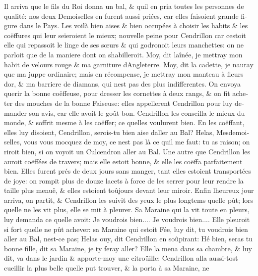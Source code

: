 \documentclass[14pt,a4paper]{memoir}
\begin{document}
\begin{otherlanguage}{french}
Il arriva que le fils du Roi donna un bal, \& qu\textquotesingle il en
pria toutes les personnes de qualité: nos deux Demoiselles en furent
aussi priées, car elles faisoient grande figure dans le Pays. Les voilà
bien aises \& bien occupées à choisir les habits \& les coëffures qui
leur seïeroient le mieux; nouvelle peine pour Cendrillon car
c\textquotesingle estoit elle qui repassoit le linge de ses sœurs \& qui
godronoit leurs manchettes: on ne parloit que de la maniere dont on
s\textquotesingle habilleroit. Moy, dit l\textquotesingle aînée, je
mettray mon habit de velours rouge \& ma garniture
d\textquotesingle Angleterre. Moy, dit la cadette, je
n\textquotesingle auray que ma juppe ordinaire; mais en récompense, je
mettray mon manteau à fleurs d\textquotesingle or, \& ma barriere de
diamans, qui n\textquotesingle est pas des plus indifferentes. On envoya
querir la bonne coëffeuse, pour dresser les cornettes à deux rangs, \&
on fit acheter des mouches de la bonne Faiseuse: elles appellerent
Cendrillon pour luy demander son avis, car elle avoit le goût bon.
Cendrillon les conseilla le mieux du monde, \& s\textquotesingle offrit
mesme à les coëffer; ce qu\textquotesingle elles voulurent bien. En les
coëffant, elles luy disoient, Cendrillon, serois-tu bien aise
d\textquotesingle aller au Bal? Helas, Mesdemoiselles, vous vous mocquez
de moy, ce n\textquotesingle est pas là ce qu\textquotesingle il me
faut: tu as raison; on riroit bien, si on voyoit un Culcendron aller au
Bal. Une autre que Cendrillon les auroit coëffées de travers; mais elle
estoit bonne, \& elle les coëffa parfaitement bien. Elles furent prés de
deux jours sans manger, tant elles estoient transportées de joye: on
rompit plus de douze lacets à force de les serrer pour leur rendre la
taille plus menuë, \& elles estoient toûjours devant leur miroir. Enfin
l\textquotesingle heureux jour arriva, on partit, \& Cendrillon les
suivit des yeux le plus longtems qu\textquotesingle elle pût; lors
qu\textquotesingle elle ne les vit plus, elle se mit à pleurer. Sa
Maraine qui la vit toute en pleurs, luy demanda ce
qu\textquotesingle elle avoit: Je voudrois bien.... Je voudrois bien....
Elle pleuroit si fort qu\textquotesingle elle ne pût achever: sa Maraine
qui estoit Fée, luy dit, tu voudrois bien aller au Bal,
n\textquotesingle est-ce pas; Helas ouy, dit Cendrillon en soûpirant: Hé
bien, seras tu bonne fille, dit sa Maraine, je t\textquotesingle y feray
aller? Elle la mena dans sa chambre, \& luy dit, va dans le jardin \&
apporte-moy une citroüille: Cendrillon alla aussi-tost cueillir la plus
belle qu\textquotesingle elle put trouver, \& la porta à sa Maraine, ne

\end{otherlanguage}
\end{document}
